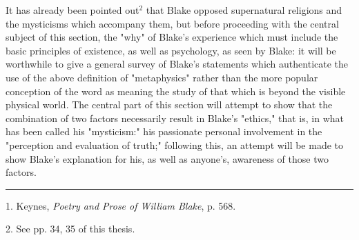 \hspace*{5mm}It has already been pointed out$^{2}$ that Blake opposed supernatural religions and the mysticisms which accompany them,
but before proceeding with the central subject of this section, the "why" of Blake's experience which must include the 
basic principles of existence, as well as psychology, as seen by Blake: it will be worthwhile to give
a general survey of Blake's statements which authenticate the use of the above definition of "metaphysics" rather
than the more popular conception of the word as meaning the study of that which is beyond the visible physical world.
The central part of this section will attempt to show that the combination of two factors necessarily result in 
Blake's "ethics," that is, in what has been called his "mysticism:" his passionate personal
involvement in the "perception and evaluation of truth;" following this, an attempt will be made to 
show Blake's explanation for his, as well as anyone's, awareness of those two factors.\par
\vspace*{\fill}
\noindent\rule{0.25\textwidth}{0.4pt}\par
1. Keynes, \textit{Poetry and Prose of William Blake}, p. 568.\par
2. See pp. 34, 35 of this thesis.\par

\newpage

